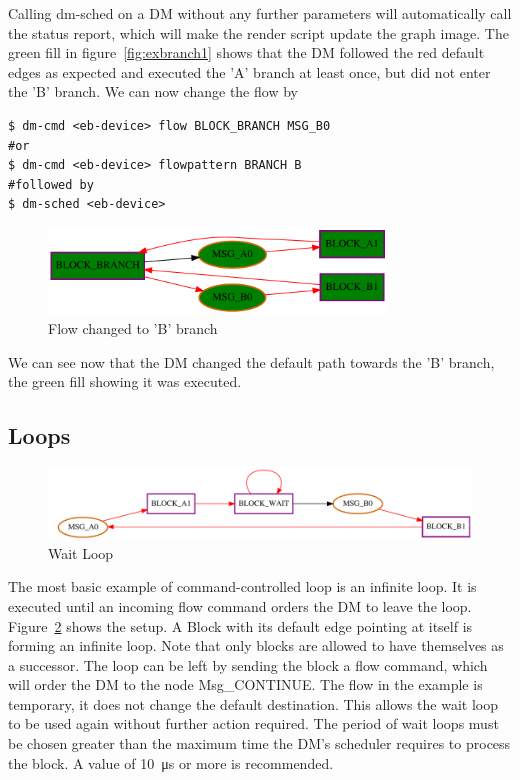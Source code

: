 Calling dm-sched on a DM without any further parameters will automatically call the status report, which will make the render script update the graph image. The green fill in figure~\ref{fig:exbranch1} shows that the DM followed the red default edges as expected and executed the 'A' branch at least once, but did not enter the 'B' branch. We can now change the flow by
%
\begin{lstlisting}[style = customshell]
$ dm-cmd <eb-device> flow BLOCK_BRANCH MSG_B0
#or
$ dm-cmd <eb-device> flowpattern BRANCH B
#followed by
$ dm-sched <eb-device>
\end{lstlisting}
%
\begin{figure}[H]
   \centering
   \def\svgwidth{0.5\textwidth}
   \includegraphics*[width=0.8\textwidth,keepaspectratio]{Figures/exbranch2}
   \caption{ Flow changed to 'B' branch }
   \label{fig:exbranch2}
\end{figure}

We can see now that the DM changed the default path towards the 'B' branch, the green fill showing it was executed.

\subsection{Loops}
\label{ssec:exwloop}
%
\begin{figure}[H]
   \centering
   \def\svgwidth{1.0\textwidth}
   \includegraphics*[width=1.0\textwidth,keepaspectratio]{Figures/exwloop}
   \caption{Wait Loop}
   \label{fig:exwloop}
\end{figure}



The most basic example of command-controlled loop is an infinite loop. It is executed until an incoming flow command orders the DM to leave the loop.
Figure~\ref{fig:exwloop} shows the setup. A Block with its default edge pointing at itself is forming an infinite loop. Note that only blocks are allowed to have themselves as a successor.
The loop can be left by sending the block a flow command, which will order the DM to the node Msg\_CONTINUE. The flow in the example is temporary, it does not change the default destination. This allows the wait loop to be used again without further action required. The period of wait loops must be chosen greater than the maximum time the DM's scheduler requires to process the block. A value of \SI{10}{\micro\second} or more is recommended.

